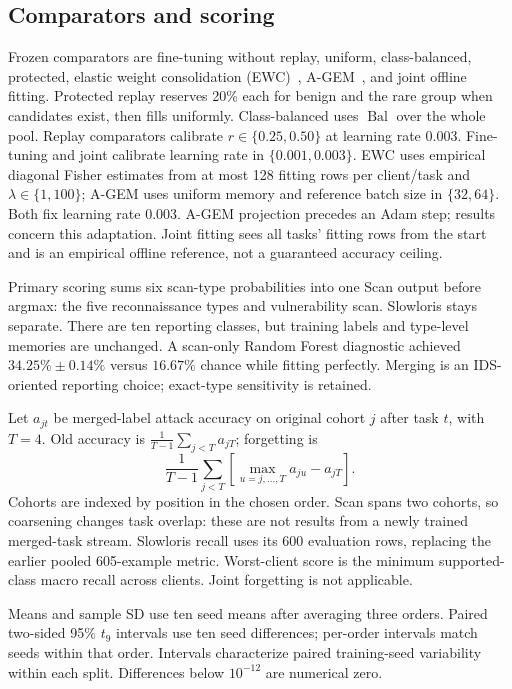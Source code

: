 \documentclass[journal,10pt]{IEEEtran}
\begin{document}
\subsection{Comparators and scoring}
Frozen comparators are fine-tuning without replay, uniform, class-balanced, protected, elastic weight consolidation (EWC)~\cite{ewc}, A-GEM~\cite{agem}, and joint offline fitting. Protected replay reserves 20\% each for benign and the rare group when candidates exist, then fills uniformly. Class-balanced uses $\operatorname{Bal}$ over the whole pool. Replay comparators calibrate $r\in\{0.25,0.50\}$ at learning rate 0.003. Fine-tuning and joint calibrate learning rate in $\{0.001,0.003\}$. EWC uses empirical diagonal Fisher estimates from at most 128 fitting rows per client/task and $\lambda\in\{1,100\}$; A-GEM uses uniform memory and reference batch size in $\{32,64\}$. Both fix learning rate 0.003. A-GEM projection precedes an Adam step; results concern this adaptation. Joint fitting sees all tasks' fitting rows from the start and is an empirical offline reference, not a guaranteed accuracy ceiling.

Primary scoring sums six scan-type probabilities into one Scan output before argmax: the five reconnaissance types and vulnerability scan. Slowloris stays separate. There are ten reporting classes, but training labels and type-level memories are unchanged. A scan-only Random Forest diagnostic achieved $34.25\%\pm0.14\%$ versus $16.67\%$ chance while fitting perfectly. Merging is an IDS-oriented reporting choice; exact-type sensitivity is retained.

Let $a_{jt}$ be merged-label attack accuracy on original cohort $j$ after task $t$, with $T=4$. Old accuracy is $\frac{1}{T-1}\sum_{j<T}a_{jT}$; forgetting is
\begin{equation}
\frac{1}{T-1}\sum_{j<T}\left[\max_{u=j,\ldots,T}a_{ju}-a_{jT}\right].
\end{equation}
Cohorts are indexed by position in the chosen order. Scan spans two cohorts, so coarsening changes task overlap: these are not results from a newly trained merged-task stream. Slowloris recall uses its 600 evaluation rows, replacing the earlier pooled 605-example metric. Worst-client score is the minimum supported-class macro recall across clients. Joint forgetting is not applicable.

Means and sample SD use ten seed means after averaging three orders. Paired two-sided 95\% $t_9$ intervals use ten seed differences; per-order intervals match seeds within that order. Intervals characterize paired training-seed variability within each split. Differences below $10^{-12}$ are numerical zero.
\end{document}
